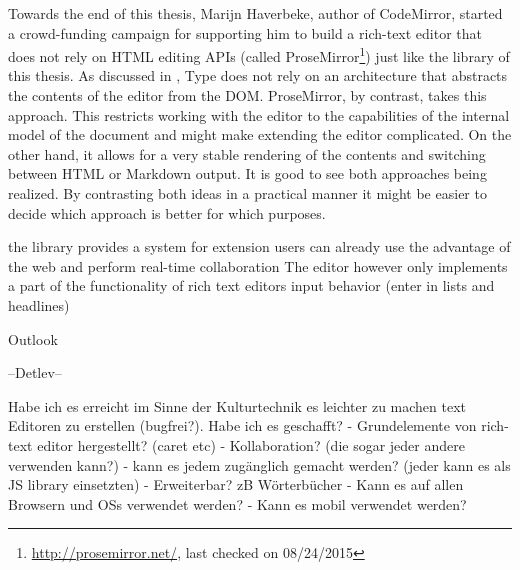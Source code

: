 Towards the end of this thesis, Marijn Haverbeke, author of CodeMirror, started a crowd-funding campaign for supporting him to build a rich-text editor that does not rely on HTML editing APIs (called ProseMirror\footnote{\url{http://prosemirror.net/}, last checked on 08/24/2015}) just like the library of this thesis. As discussed in , Type does not rely on an architecture that abstracts the contents of the editor from the DOM. ProseMirror, by contrast, takes this approach. This restricts working with the editor to the capabilities of the internal model of the document and might make extending the editor complicated. On the other hand, it allows for a very stable rendering of the contents and switching between HTML or Markdown output. It is good to see both approaches being realized. By contrasting both ideas in a practical manner it might be easier to decide which approach is better for which purposes.



\iffalse



the library provides a system for extension
users can already use the advantage of the web and perform real-time collaboration
The editor however only implements a part of the functionality of rich text editors
input behavior (enter in lists and headlines)

Outlook

--Detlev--

Habe ich es erreicht im Sinne der Kulturtechnik es leichter zu machen text Editoren zu erstellen (bugfrei?).
Habe ich es geschafft?
 - Grundelemente von rich-text editor hergestellt? (caret etc)
 - Kollaboration? (die sogar jeder andere verwenden kann?)
 - kann es jedem zugänglich gemacht werden? (jeder kann es als JS library einsetzten)
 - Erweiterbar? zB Wörterbücher
 - Kann es auf allen Browsern und OSs verwendet werden?
 - Kann es mobil verwendet werden?




